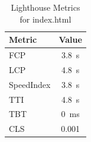    \begin{table}[H]
    \centering
    \caption{Lighthouse Metrics for index.html}
    \begin{tabular}{|l|c|}
    \hline
    Metric & Value \\ \hline
    FCP & 3.8 s \\ \hline
    LCP & 4.8 s \\ \hline
    SpeedIndex & 3.8 s \\ \hline
    TTI & 4.8 s \\ \hline
    TBT & 0 ms \\ \hline
    CLS & 0.001 \\ \hline
    \end{tabular}
    \end{table}
    